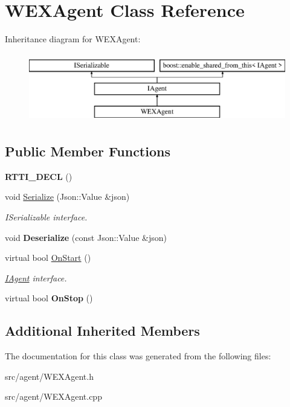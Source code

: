 \hypertarget{class_w_e_x_agent}{}\section{W\+E\+X\+Agent Class Reference}
\label{class_w_e_x_agent}
Inheritance diagram for W\+E\+X\+Agent\+:\begin{figure}[H]
\begin{center}
\leavevmode
\includegraphics[height=3.000000cm]{class_w_e_x_agent}
\end{center}
\end{figure}
\subsection*{Public Member Functions}
\begin{DoxyCompactItemize}
\item 
\mbox{\label{class_w_e_x_agent_a74fc5e36292e00b5c9553d84ebed0bf6}} 
{\bfseries R\+T\+T\+I\+\_\+\+D\+E\+CL} ()
\item 
\mbox{\label{class_w_e_x_agent_a30332bb4ad25fe0488de32da574ef456}} 
void \hyperlink{class_w_e_x_agent_a30332bb4ad25fe0488de32da574ef456}{Serialize} (Json\+::\+Value \&json)
\begin{DoxyCompactList}\small\item\em I\+Serializable interface. \end{DoxyCompactList}\item 
\mbox{\label{class_w_e_x_agent_aec5c75846516d71dcfca940cc9f77488}} 
void {\bfseries Deserialize} (const Json\+::\+Value \&json)
\item 
\mbox{\label{class_w_e_x_agent_af9d693a9a2a10c33bb81f9329d1ad775}} 
virtual bool \hyperlink{class_w_e_x_agent_af9d693a9a2a10c33bb81f9329d1ad775}{On\+Start} ()
\begin{DoxyCompactList}\small\item\em \hyperlink{class_i_agent}{I\+Agent} interface. \end{DoxyCompactList}\item 
\mbox{\label{class_w_e_x_agent_a8c0742c60eb43f4ec80b1d8b2c60555e}} 
virtual bool {\bfseries On\+Stop} ()
\end{DoxyCompactItemize}
\subsection*{Additional Inherited Members}


The documentation for this class was generated from the following files\+:\begin{DoxyCompactItemize}
\item 
src/agent/W\+E\+X\+Agent.\+h\item 
src/agent/W\+E\+X\+Agent.\+cpp\end{DoxyCompactItemize}
